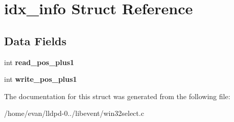 \section{idx\-\_\-info \-Struct \-Reference}
\label{structidx__info}
\subsection*{\-Data \-Fields}
\begin{DoxyCompactItemize}
\item 
int {\bfseries read\-\_\-pos\-\_\-plus1}\label{structidx__info_a30750adc8222df6e90d758d5dd7bfaf0}

\item 
int {\bfseries write\-\_\-pos\-\_\-plus1}\label{structidx__info_a6f7fabad62eac7f97bb3ded52d0908ee}

\end{DoxyCompactItemize}


\-The documentation for this struct was generated from the following file\-:\begin{DoxyCompactItemize}
\item 
/home/evan/lldpd-\/0../libevent/win32select.\-c\end{DoxyCompactItemize}
